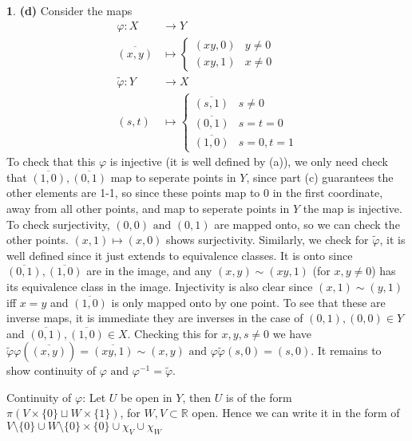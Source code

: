 \documentclass[10.5pt]{article}
\theoremstyle{definition}
\newtheorem{pb}{}
\newcommand{\set}[1]{\{#1\}}
\newcommand{\tand}{\text{ and }}
\begin{document}
\begin{pb}
        \textbf{(d)} Consider the maps
        \begin{align*}
            \varphi: X &\to Y \\
            \overline{(x,y)} &\mapsto \begin{cases}
                (xy,0) & y \neq 0 \\ 
                (xy,1) & x \neq 0
            \end{cases} \\
            \tilde{\varphi}: Y &\to X \\
            (s,t) &\mapsto \begin{cases}
                \overline{(s,1)} & s \neq 0 \\
                \overline{(0,1)} & s = t = 0 \\
                \overline{(1,0)} & s=0, t=1
            \end{cases}
        \end{align*}
        To check that this \(\varphi\) is injective (it is well defined by (a)), we only need check that \(\overline{(1,0)}, \overline{(0,1)}\) map to seperate points in \(Y \), since part (c) guarantees
        the other elements are 1-1, so since these points map to \(0\) in the first coordinate, away from all other points, and map to seperate points in \(Y\) the map is injective.
        To check surjectivity, \((0,0) \tand (0,1)\) are mapped onto, so we can check the other points. \((x,1) \mapsto (x,0)\) shows surjectivity. Similarly, we check for \(\tilde{\varphi}\),
        it is well defined since it just extends to equivalence classes. It is onto since \(\overline{(0,1)}, \overline{(1,0)}\) are in the image, and any
        \((x,y) \sim (xy,1)\) (for \(x,y \neq 0\)) has its equivalence class in the image. Injectivity is also clear since \((x,1) \sim (y,1)\) iff \(x=y\) and \(\overline{(1,0)}\) is only mapped onto by one point.
        To see that these are inverse maps, it is immediate they are inverses in the case of \((0,1),(0,0) \in Y\) and \(\overline{(0,1)},\overline{(1,0)} \in X\).
        Checking this for \(x,y,s \neq 0\) we have \(\tilde{\varphi}\varphi(\overline{(x,y)}) = \overline{(xy,1)} \sim  (x,y) \tand \varphi \tilde{\varphi}(s,0) = (s,0)\). It remains to show continuity of
        \(\varphi \tand \varphi^{-1} = \tilde{\varphi}\).

        Continuity of \(\varphi\): Let \(U\) be open in \(Y\), then \(U\) is of the form \(\pi(V \times \set{0} \sqcup W \times \set{1})\), for \(W,V \subset \mathbb{R}\) open. Hence we can write it in the 
        form of \(V \setminus \set{0} \cup W\setminus \set{0} \times \set{0} \cup \chi_V \cup \chi_W\)
    \end{pb}
\end{document}
